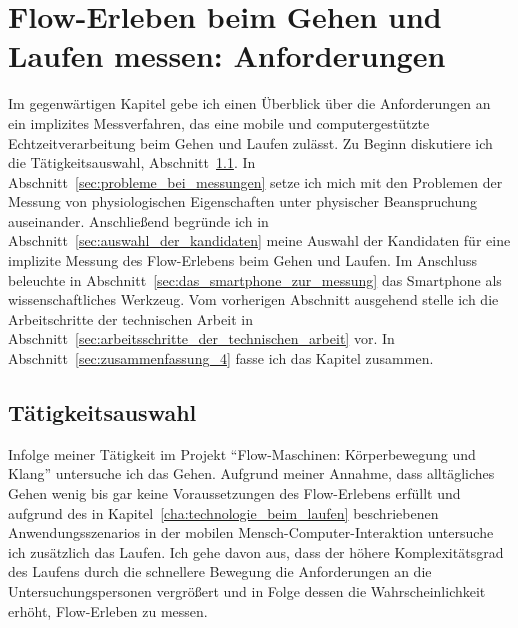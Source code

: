 \chapter{Flow-Erleben beim Gehen und Laufen messen: Anforderungen}
\label{cha:flow_erleben_beim_gehen_und_laufen_messen_anforderungen}
Im gegenwärtigen Kapitel gebe ich einen Überblick über die Anforderungen an ein implizites Messverfahren, das eine mobile und computergestützte Echtzeitverarbeitung beim Gehen und Laufen zulässt. Zu Beginn diskutiere ich die Tätigkeitsauswahl, Abschnitt~\ref{sec:taetigkeitsauswahl}. In Abschnitt~\ref{sec:probleme_bei_messungen} setze ich mich mit den Problemen der Messung von physiologischen Eigenschaften unter physischer Beanspruchung auseinander. Anschließend begründe ich in Abschnitt~\ref{sec:auswahl_der_kandidaten} meine Auswahl der Kandidaten für eine implizite Messung des Flow-Erlebens beim Gehen und Laufen. Im Anschluss beleuchte in Abschnitt~\ref{sec:das_smartphone_zur_messung} das Smartphone als wissenschaftliches Werkzeug. Vom vorherigen Abschnitt ausgehend stelle ich die Arbeitschritte der technischen Arbeit in Abschnitt~\ref{sec:arbeitsschritte_der_technischen_arbeit} vor. In Abschnitt~\ref{sec:zusammenfassung_4} fasse ich das Kapitel zusammen.

\section{Tätigkeitsauswahl}
\label{sec:taetigkeitsauswahl}
Infolge meiner Tätigkeit im Projekt "`Flow-Maschinen: Körperbewegung und Klang"' untersuche ich das Gehen. Aufgrund meiner Annahme, dass alltägliches Gehen wenig bis gar keine Voraussetzungen des Flow-Erlebens erfüllt und aufgrund des in Kapitel~\ref{cha:technologie_beim_laufen} beschriebenen Anwendungsszenarios in der mobilen Mensch-Computer-Interaktion untersuche ich zusätzlich das Laufen. Ich gehe davon aus, dass der höhere Komplexitätsgrad des Laufens durch die schnellere Bewegung die Anforderungen an die Untersuchungspersonen vergrößert und in Folge dessen die Wahrscheinlichkeit erhöht, Flow-Erleben zu messen.

